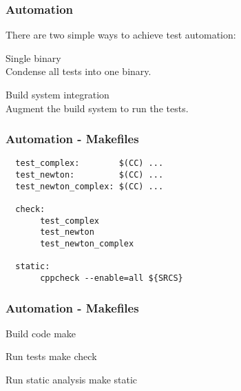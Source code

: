 \begin{frame}
  \frametitle{Automation}
  {\large
  There are two simple ways to achieve test automation:

  \vspace{0.5cm}
  {\color{Base09} Single binary}\\\hspace{0.5cm}Condense all tests into one binary.

  \vspace{0.5cm}
  {\color{Base09} Build system integration}\\\hspace{0.5cm}Augment the build system to run the tests.
  }
\end{frame}

\begin{frame}[fragile]
  \frametitle{Automation - Makefiles}
  \begin{example}
    \begin{lstlisting}
  test_complex:        $(CC) ...
  test_newton:         $(CC) ...
  test_newton_complex: $(CC) ... 

  check:
       test_complex
       test_newton
       test_newton_complex

  static:
       cppcheck --enable=all ${SRCS}
    \end{lstlisting}
  \end{example}
\end{frame}

\begin{frame}[fragile]
  \frametitle{Automation - Makefiles}
  \begin{block}{Build code}
    \vspace{0.2cm}
    make
    \vspace{0.2cm}
  \end{block}
  \begin{block}{Run tests}
    \vspace{0.2cm}
    make check
    \vspace{0.2cm}
  \end{block}
  \begin{block}{Run static analysis}
    \vspace{0.2cm}
    make static
    \vspace{0.2cm}
  \end{block}
\end{frame}
